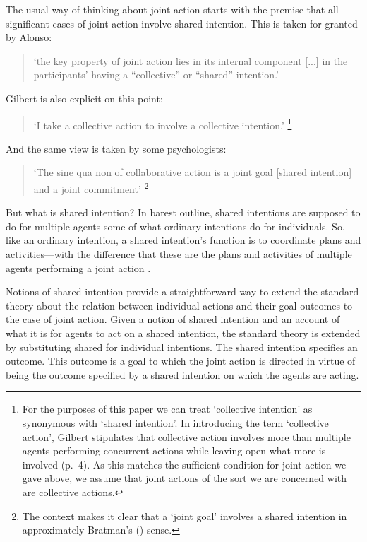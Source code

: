 \documentclass[12pt,a4paper]{extarticle}
\begin{document}
The usual way of thinking about joint action starts with the premise that all significant cases of joint action involve shared intention.  This is taken for granted by Alonso:
%
\begin{quote}
`the key property of joint action lies in its internal component [...] in the participants’ having a “collective” or “shared” intention.' \citep[pp. 444-5]{alonso_shared_2009}
\end{quote}
%
Gilbert is also explicit on this point:  
%
\begin{quote} 
`I take a collective action to involve a collective intention.'  \citep[p.\ 5]{Gilbert:2006wr}\footnote{
For the purposes of this paper we can treat `collective intention' as synonymous with `shared intention'.  
In introducing the term `collective action', Gilbert stipulates that collective action involves more than multiple agents performing concurrent actions while leaving open what more is involved (p.\ 4).   
As this matches the sufficient condition for joint action we gave above, we assume that joint actions of the sort we are concerned with are collective actions.
}
\end{quote}
%
And the same view is taken by some psychologists:
%
\begin{quote}
`The sine qua non of collaborative action is a joint goal [shared intention] and a joint commitment’ 
\citep[p.\ 181]{tomasello:2008origins}\footnote{
The context makes it clear that a `joint goal' involves a shared intention in approximately Bratman's (\citeyear{Bratman:1993je}) sense.
}
\end{quote}
%
But what is shared intention?  
In barest outline, shared intentions are supposed to do for multiple agents some of what ordinary intentions do for individuals.  So, like an ordinary intention, a shared intention's function is to coordinate plans and activities---with the difference that these are the plans and activities of multiple agents performing a joint action \citep{Bratman:1993je}.


Notions of shared intention provide a straightforward way to extend the standard theory about the relation between individual actions and their goal-outcomes to the case of joint action.  
Given a notion of shared intention and an account of what it is for agents to act on a shared intention, 
the standard theory is extended by substituting shared for individual intentions.  The shared intention specifies an outcome.  This outcome is a goal to which the joint action is directed in virtue of being the outcome specified by a shared intention on which the agents are acting.
\end{document}
